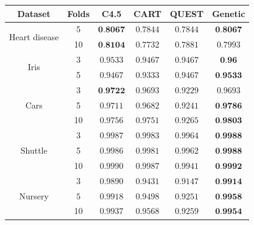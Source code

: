 \documentclass[english]{beamer}
\begin{document}
\begin{frame}{}
	\begin{table}
		\begin{tabular}{|c|c|c|c|c|c|}
			\hline \textbf{Dataset} & \textbf{Folds} & \textbf{C4.5} & \textbf{CART} & \textbf{QUEST} & \textbf{Genetic} \\ \hline
			\multirow{2}{*}{Heart disease} & 5 & \underline{$\textbf{0.8067}$} & $0.7844$ & $0.7844$ & \underline{$\textbf{0.8067}$} \\
			& 10 & \underline{$\textbf{0.8104}$} & $0.7732$ & $0.7881$ & $0.7993$ \\ \hline
			\multirow{2}{*}{Iris} & 3 & $0.9533$ & $0.9467$ & $0.9467$ & \underline{$\textbf{0.96}$} \\ & 5 & $0.9467$ & $0.9333$ & $0.9467$ & \underline{$\textbf{0.9533}$} \\ \hline
			\multirow{3}{*}{Cars} & 3 & \underline{$\textbf{0.9722}$} & $0.9693$ & $0.9229$ & $0.9693$ \\
			& 5 & $0.9711$ & $0.9682$ & $0.9241$ & \underline{$\textbf{0.9786}$} \\
			& 10 & $0.9756$ & $0.9751$ & $0.9265$ & \underline{$\textbf{0.9803}$} \\ \hline
			\multirow{3}{*}{Shuttle} & 3 & $0.9987$ & $0.9983$ & $0.9964$ & \underline{$\textbf{0.9988}$}  \\
			& 5 & $0.9986$ & $0.9981$ & $0.9962$ & \underline{$\textbf{0.9988}$} \\
			& 10 & $0.9990$ & $0.9987$ & $0.9941 $ & \underline{$\textbf{0.9992}$} \\ \hline
			\multirow{3}{*}{Nursery} & 3 & $0.9890$ & $0.9431$ & $0.9147$ & \underline{$\textbf{0.9914}$} \\
			& $5$ & $0.9918$ & $0.9498$ & $0.9251$ & \underline{$\textbf{0.9958}$} \\
			& 10 & $0.9937$ & $0.9568$ & $0.9259$ & \underline{$\textbf{0.9954}$} \\ \hline
		\end{tabular}
	\end{table}
\end{frame}
\end{document}
